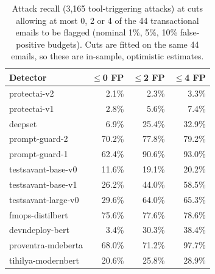 \documentclass[11pt]{article}
\begin{document}
\begin{table}[h]
\centering
\footnotesize
\setlength{\tabcolsep}{3pt}
\caption{Attack recall (3{,}165 tool-triggering attacks) at cuts allowing at most 0, 2 or 4 of the 44 transactional emails to be flagged (nominal 1\%, 5\%, 10\% false-positive budgets). Cuts are fitted on the same 44 emails, so these are in-sample, optimistic estimates.}
\label{tab:oppoints}
\begin{tabular}{lrrr}
\toprule
Detector & $\leq$0 FP & $\leq$2 FP & $\leq$4 FP \\
\midrule
protectai-v2 & 2.1\% & 2.3\% & 3.3\% \\
protectai-v1 & 2.8\% & 5.6\% & 7.4\% \\
deepset & 6.9\% & 25.4\% & 32.9\% \\
prompt-guard-2 & 70.2\% & 77.8\% & 79.2\% \\
prompt-guard-1 & 62.4\% & 90.6\% & 93.0\% \\
testsavant-base-v0 & 11.6\% & 19.1\% & 20.2\% \\
testsavant-base-v1 & 26.2\% & 44.0\% & 58.5\% \\
testsavant-large-v0 & 29.6\% & 64.0\% & 65.3\% \\
fmops-distilbert & 75.6\% & 77.6\% & 78.6\% \\
devndeploy-bert & 3.4\% & 30.3\% & 38.4\% \\
proventra-mdeberta & 68.0\% & 71.2\% & 97.7\% \\
tihilya-modernbert & 20.6\% & 25.8\% & 28.9\% \\
\bottomrule
\end{tabular}
\end{table}
\end{document}
